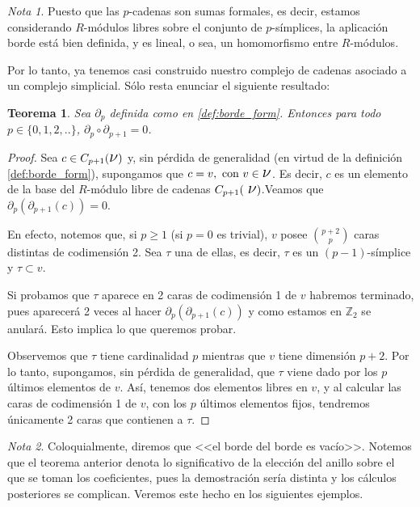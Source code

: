 \documentclass[12pt, a4paper, twoside]{book}
\numberwithin{equation}{section}
\newtheorem{theorem}{Teorema}
\theoremstyle{definition}
\theoremstyle{remark}
\newtheorem*{remark}{Nota}
\theoremstyle{plain}
\begin{document}
	\begin{remark}
	Puesto que las $p$-cadenas son sumas formales, es decir, estamos 
	considerando $R$-módulos libres sobre el conjunto de $p$-símplices, la 
	aplicación borde está bien definida, y es lineal, o sea, un 
	homomorfismo entre $R$-módulos.
	\end{remark}


	Por lo tanto, ya tenemos casi construido nuestro complejo de cadenas 
	asociado a un complejo simplicial. Sólo resta enunciar el siguiente 
	resultado:

	\begin{theorem}
		Sea $\partial_{p}$ definida como en \ref{def:borde_form}. 
		Entonces para todo $p \in \{0,1,2,..\}$, $\partial_{p}\circ 
		\partial_{p+1}=0$.
	\end{theorem}
	\begin{proof}
		Sea $c \in C_{p+1}(\text{{\Large $\nu$}})$ y, sin pérdida
		de generalidad (en virtud de la definición 
		\ref{def:borde_form}), supongamos que $c=v,\text{ con }v\in 
		\text{{\Large $\nu$}}$. Es decir, $c$ es un elemento de la 
		base del $R$-módulo libre de cadenas $C_{p+1}(\text{
		{\Large $\nu$}})$.Veamos que $\partial_{p}(
		\partial_{p+1}(c))=0$.

		En efecto, notemos que, si $p\geq1$ (si $p=0$ es trivial), $v$ 
		posee $\binom{p+2}{p}$ 
		caras distintas de codimensión 2. Sea $\tau$ una de ellas, es 
		decir, $\tau$ es un $(p-1)$-símplice y $\tau \subset v$.

		Si probamos que $\tau$ aparece en 2 caras de codimensión 1 de 
		$v$ habremos terminado, pues aparecerá 2 veces al 
		hacer $\partial_{p}(\partial_{p+1}(c))$ y como estamos en 
		$\mathbb{Z}_{2}$ se anulará. Esto implica lo que queremos
		probar.

		Observemos que $\tau$ tiene cardinalidad $p$ mientras que $v$ 
		tiene dimensión $p+2$. Por lo tanto, supongamos, sin pérdida 
		de generalidad, que $\tau$ viene dado por los $p$ últimos 
		elementos de $v$. Así, tenemos dos elementos libres en $v$, y 
		al calcular las caras de codimensión 1 de $v$, con los $p$ 
		últimos elementos fijos, tendremos únicamente 2 caras que 
		contienen a $\tau$.  	
	\end{proof}
	
	\begin{remark}
		Coloquialmente, diremos que <<el borde del borde es vacío>>. 
		Notemos que el teorema anterior denota lo significativo de la 
		elección del anillo sobre el que se toman los coeficientes, 
		pues la demostración sería distinta y los cálculos posteriores 
		se complican. Veremos este hecho en los siguientes ejemplos.
	\end{remark}
\end{document}
